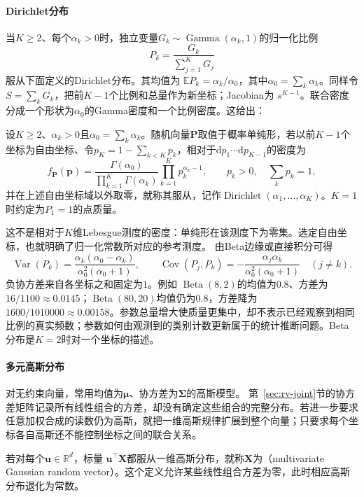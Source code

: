 \paragraph{Dirichlet分布}
当\(K\geq2\)、每个\(\alpha_k>0\)时，独立变量\(G_k\sim\operatorname{Gamma}(\alpha_k,1)\)的归一化比例
\[ P_k=\frac{G_k}{\sum_{j=1}^{K}G_j} \]
服从下面定义的Dirichlet分布。其均值为
\(\mathbb{E}P_k=\alpha_k/\alpha_0\)，其中\(\alpha_0=\sum_k\alpha_k\)。同样令
\(S=\sum_kG_k\)，把前\(K-1\)个比例和总量作为新坐标；Jacobian为
\(s^{K-1}\)。联合密度分成一个形状为\(\alpha_0\)的Gamma密度和一个比例密度。这给出：
\begin{definition}[Dirichlet分布]
  \label{def:probability-dirichlet-distribution}
设\(K\geq2\)、\(\alpha_k>0\)且\(\alpha_0=\sum_k\alpha_k\)。随机向量\(\bm P\)取值于概率单纯形，若以前\(K-1\)个坐标为自由坐标、令\(p_K=1-\sum_{k<K}p_k\)，相对于\(\mathrm dp_1\cdots\mathrm dp_{K-1}\)的密度为
\[
  f_{\bm{P}}(\bm{p})
  =
  \frac{\Gamma(\alpha_0)}
       {\prod_{k=1}^{K}\Gamma(\alpha_k)}
  \prod_{k=1}^{K}p_k^{\alpha_k-1},
  \qquad p_k>0,\quad\sum_kp_k=1,
\]
并在上述自由坐标域以外取零，就称其服从，记作\(\operatorname{Dirichlet}(\alpha_1,\ldots,\alpha_K)\)。\(K=1\)时约定为\(P_1=1\)的点质量。
\end{definition}
这不是相对于\(K\)维Lebesgue测度的密度：单纯形在该测度下为零集。选定自由坐标，也就明确了归一化常数所对应的参考测度。
由Beta边缘或直接积分可得
\[
  \operatorname{Var}(P_k)
  =\frac{\alpha_k(\alpha_0-\alpha_k)}
        {\alpha_0^2(\alpha_0+1)},\qquad
  \operatorname{Cov}(P_j,P_k)
  =-\frac{\alpha_j\alpha_k}
         {\alpha_0^2(\alpha_0+1)}
  \quad(j\neq k).
\]
负协方差来自各坐标之和固定为\(1\)。例如
\(\operatorname{Beta}(8,2)\)的均值为\(0.8\)、方差为
\(16/1100\approx0.0145\)；\(\operatorname{Beta}(80,20)\)均值仍为\(0.8\)，方差降为
\(1600/1010000\approx0.00158\)。参数总量增大使质量更集中，却不表示已经观察到相同比例的真实频数；参数如何由观测到的类别计数更新属于的统计推断问题。Beta分布是\(K=2\)时对一个坐标的描述。

\paragraph{多元高斯分布}
对无约束向量，常用均值为\(\bm\mu\)、协方差为\(\bm\Sigma\)的高斯模型。
第~\ref{sec:rv-joint}节的协方差矩阵记录所有线性组合的方差，却没有确定这些组合的完整分布。若进一步要求任意加权合成的读数仍为高斯，就把一维高斯规律扩展到整个向量；只要求每个坐标各自高斯还不能控制坐标之间的联合关系。
\begin{definition}[多元高斯随机向量]
  \label{def:probability-multivariate-gaussian}
  若对每个\(\bm{u}\in\mathbb{R}^d\)，标量
\(\bm{u}^{\top}\bm{X}\)都服从一维高斯分布，就称\(\bm{X}\)为（multivariate Gaussian random vector）。这个定义允许某些线性组合方差为零，此时相应高斯分布退化为常数。
\end{definition}

